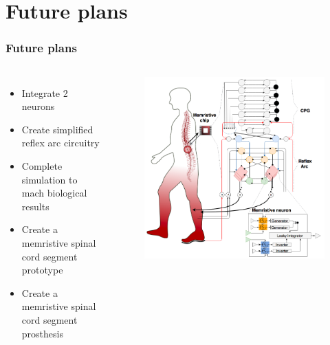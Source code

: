 \documentclass[12pt, aspectratio=169]{beamer}
\begin{document}
\section{Future plans}

\begin{frame}
  \frametitle{Future plans}
\begin{columns}[c]

\begin{itemize}
\item Integrate 2 neurons
\item Create simplified reflex arc circuitry
\item Complete simulation to mach biological results
\item Create a memristive spinal cord segment prototype
\item Create a memristive spinal cord segment prosthesis
\end{itemize}

\begin{figure}
\includegraphics[width=1.0\linewidth]{MemArc_logo}
\end{figure}
\end{columns}
\end{frame}
\end{document}
